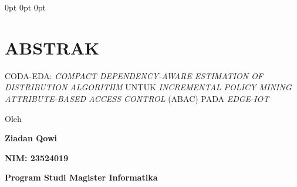 \begingroup
\titlespacing*{\chapter}
  {0pt}
  {0pt}
  {0pt}

\chapter*{ABSTRAK}

\endgroup




\begingroup


\setlength{\parindent}{0pt}
\setlength{\parskip}{0pt}



\vspace{14.4pt}


%

{\centering
\normalfont
\bfseries
\fontsize{14pt}{16.8pt}\selectfont

CODA-EDA: \textit{COMPACT DEPENDENCY-AWARE ESTIMATION OF DISTRIBUTION ALGORITHM} UNTUK \textit{INCREMENTAL POLICY MINING ATTRIBUTE-BASED ACCESS CONTROL} (ABAC) PADA \textit{EDGE-IOT}

\par
}



\vspace{14.4pt}


%

{\centering
\normalfont
\fontsize{12pt}{14.4pt}\selectfont

Oleh\par

\textbf{Ziadan Qowi}\par
\textbf{NIM: 23524019}\par
\textbf{Program Studi Magister Informatika}\par

}


